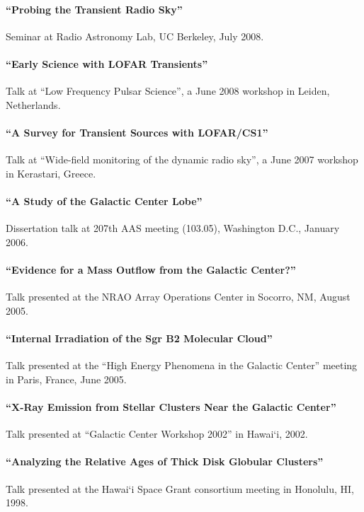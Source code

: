 \documentclass[12pt]{article}
\begin{document}
\paragraph{``Probing the Transient Radio Sky''} Seminar at Radio Astronomy Lab, UC Berkeley, July 2008.

\paragraph{``Early Science with LOFAR Transients''} Talk at ``Low Frequency Pulsar Science'', a June 2008 workshop in Leiden, Netherlands.

\paragraph{``A Survey for Transient Sources with LOFAR/CS1''} Talk at ``Wide-field monitoring of the dynamic radio sky'', a June 2007 workshop in Kerastari, Greece.

\paragraph{``A Study of the Galactic Center Lobe''} Dissertation talk at 207th AAS meeting (103.05), Washington D.C., January 2006.

\paragraph{``Evidence for a Mass Outflow from the Galactic Center?''} Talk presented at the NRAO Array Operations Center in Socorro, NM, August 2005.

\paragraph{``Internal Irradiation of the Sgr B2 Molecular Cloud''} Talk presented at the ``High Energy Phenomena in the Galactic Center'' meeting in Paris, France, June 2005.

\paragraph{``X-Ray Emission from Stellar Clusters Near the Galactic Center''} Talk presented at ``Galactic Center Workshop 2002'' in Hawai`i, 2002.

\paragraph{``Analyzing the Relative Ages of Thick Disk Globular Clusters''} Talk presented at the Hawai`i Space Grant consortium meeting in Honolulu, HI, 1998.
\end{document}

